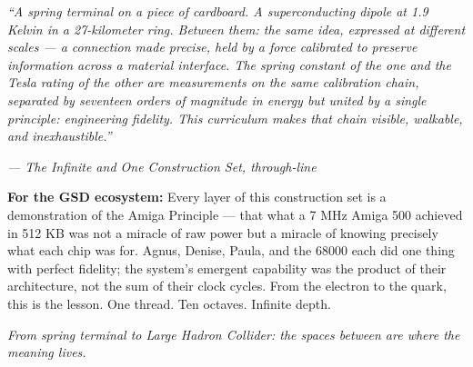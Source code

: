 \documentclass[11pt,letterpaper]{article}
\begin{document}
\begin{quotebox}
\textit{``A spring terminal on a piece of cardboard. A superconducting dipole at 1.9 Kelvin in a
27-kilometer ring. Between them: the same idea, expressed at different scales --- a connection
made precise, held by a force calibrated to preserve information across a material interface.
The spring constant of the one and the Tesla rating of the other are measurements on the same
calibration chain, separated by seventeen orders of magnitude in energy but united by a single
principle: engineering fidelity. This curriculum makes that chain visible, walkable, and
inexhaustible.''}

\vspace{0.8em}
\textit{--- The Infinite and One Construction Set, through-line}

\vspace{1em}
\textbf{For the GSD ecosystem:} Every layer of this construction set is a demonstration of the
Amiga Principle --- that what a 7 MHz Amiga 500 achieved in 512 KB was not a miracle of raw
power but a miracle of knowing precisely what each chip was for. Agnus, Denise, Paula, and the
68000 each did one thing with perfect fidelity; the system's emergent capability was the product
of their architecture, not the sum of their clock cycles. From the electron to the quark, this
is the lesson. One thread. Ten octaves. Infinite depth.

\vspace{0.8em}
\textit{From spring terminal to Large Hadron Collider: the spaces between are where the meaning lives.}
\end{quotebox}
\end{document}
